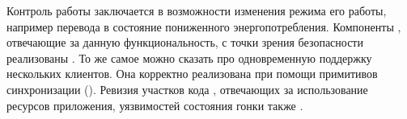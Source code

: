 %
Контроль работы  заключается в возможности изменения режима его работы, например перевода в состояние пониженного энергопотребления. 
%
Компоненты , отвечающие за данную функциональность, с точки зрения безопасности реализованы . 
%
То же самое можно сказать про одновременную поддержку нескольких клиентов. 
%
Она корректно реализована при помощи примитивов синхронизации (). 
%
Ревизия участков кода , отвечающих за использование ресурсов приложения, уязвимостей состояния гонки также . 
